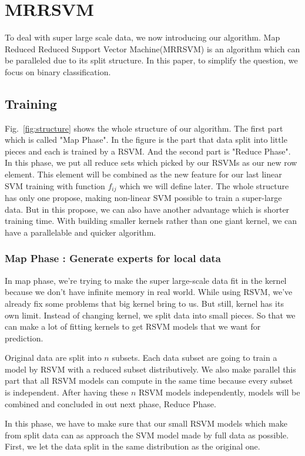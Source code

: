 \documentclass[conference]{IEEEtran}
\begin{document}
\section{MRRSVM}
\label{sec:MRRSVM}
To deal with super large scale data, we now introducing our algorithm. Map Reduced Reduced Support Vector Machine(MRRSVM) is an algorithm which can be paralleled due to its split structure. In this paper, to simplify the question, we focus on binary classification.

\subsection{Training}
Fig.~\ref{fig:structure} shows the whole structure of our algorithm. The first part which is called "Map Phase". In the figure is the part that data split into little pieces and each is trained by a RSVM. And the second part is "Reduce Phase". In this phase, we put all reduce sets which picked by our RSVMs as our new row element. This element will be combined as the new feature for our last linear SVM training with function $f_{ij}$ which we will define later.
The whole structure has only one propose, making non-linear SVM possible to train a super-large data. But in this propose, we can also have another advantage which is shorter training time. With building smaller kernels rather than one giant kernel, we can have a parallelable and quicker algorithm.

\subsubsection{Map Phase : Generate experts for local data}
In map phase, we're trying to make the super large-scale data fit in the kernel because we don't have infinite memory in real world. While using RSVM, we've already fix some problems that big kernel bring to us. But still, kernel has its own limit. Instead of changing kernel, we split data into small pieces. So that we can make a lot of fitting kernels to get RSVM models that we want for prediction.

Original data are split into $n$ subsets. Each data subset are going to train a model by RSVM with a reduced subset distributively. We also make parallel this part that all RSVM models can compute in the same time because every subset is independent. After having these $n$ RSVM models independently, models will be combined and concluded in out next phase, Reduce Phase.

In this phase, we have to make sure that our small RSVM models which make from split data can as approach the SVM model made by full data as possible. First, we let the data split in the same distribution as the original one. 
\end{document}
